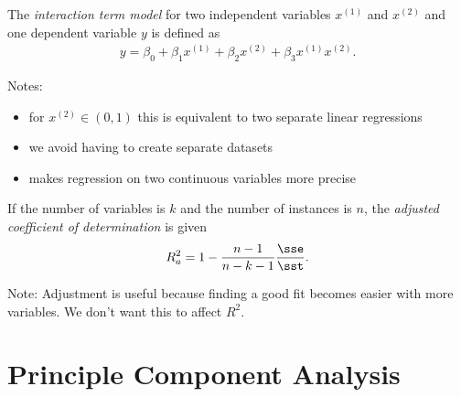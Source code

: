 \documentclass{article}
\begin{document}
\begin{definition}
	The \emph{interaction term model} for two independent variables $x^{(1)}$ and $x^{(2)}$ and one dependent variable $y$
	is defined as
	\begin{align*}
		y = \beta_0 + \beta_1 x^{(1)} + \beta_2 x^{(2)} + \beta_3 x^{(1)}x^{(2)}.
	\end{align*}
\end{definition}
Notes:
\begin{itemize}
	\item for $x^{(2)}\in (0,1)$ this is equivalent to two separate linear regressions
	\item we avoid having to create separate datasets
	\item makes regression on two continuous variables more precise
\end{itemize}
\begin{definition}
	If the number of variables is $k$ and the number of instances is $n$, the
	\emph{adjusted coefficient of determination} is given
	\begin{align*}
		R^2_a = 1 - \frac{n-1}{n-k-1}\frac{\sse}{\sst}.
	\end{align*}
\end{definition}
Note: Adjustment is useful because finding a good fit becomes easier with more variables. We don't want this to affect $R^2$.


\section{Principle Component Analysis}
\end{document}

